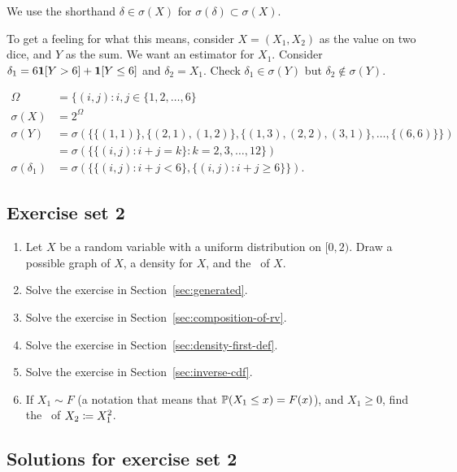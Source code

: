 \documentclass{article}
\begin{document}
We use the shorthand $\delta \in \sigma(X)$ for $\sigma(\delta) \subset \sigma(X)$.

 To get a feeling for what this means, consider $X = (X_1, X_2)$ as the value on two dice, and $Y$ as the sum. We want an estimator for $X_1$. Consider $\delta_1 = 6 \1[Y > 6] + \1[Y \le 6]$ and $\delta_2 = X_1$. Check $\delta_1 \in \sigma(Y)$ but $\delta_2 \notin \sigma(Y)$.

\begin{align*}
\Omega &= \{ (i, j) : i,j \in \{1, 2, \dots, 6\} \\
\sigma(X) &= 2^{\Omega} \\
\sigma(Y) &= \sigma(\{\{(1,1)\}, \{(2,1), (1,2)\}, \{(1,3),(2,2),(3,1)\}, \dots, \{(6,6)\}\}) \\
&= \sigma( \{ \{(i,j) : i + j = k\}   : k = 2, 3, \dots, 12  \} ) \\
\sigma(\delta_1) &= \sigma( \{ \{(i,j) : i + j < 6\}, \{(i,j) : i + j \ge 6\}  \} ). 
\end{align*}


\subsection{Exercise set 2}\label{sec:ex-set-2}

\begin{enumerate}
  \item Let $X$ be a random variable with a uniform distribution on $[0, 2)$. Draw a possible graph of $X$, a density for $X$, and the \CDF\ of $X$.
  \item Solve the exercise in Section~\ref{sec:generated}.
  \item Solve the exercise in Section~\ref{sec:composition-of-rv}.
  \item Solve the exercise in Section~\ref{sec:density-first-def}.
  \item Solve the exercise in Section~\ref{sec:inverse-cdf}.
  \item If $X_1 \sim F$ (a notation that means that $\P(X_1 \le x) = F(x)$), and $X_1 \ge 0$, find the \CDF\ of $X_2 \defeq X_1^2$.
\end{enumerate}
 

\subsection{Solutions for exercise set 2}
\end{document}
